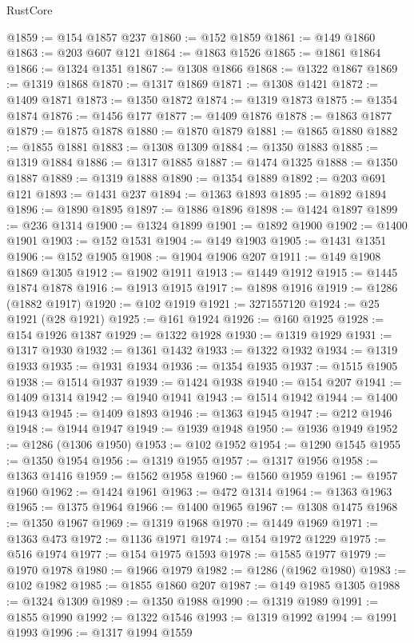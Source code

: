 \begin{lexlean}{RustCore}
\begin{coremodule}
@1859 := @154 @1857 @237
@1860 := @152 @1859
@1861 := @149 @1860
@1863 := @203 @607 @121
@1864 := @1863 @1526
@1865 := @1861 @1864
@1866 := @1324 @1351
@1867 := @1308 @1866
@1868 := @1322 @1867
@1869 := @1319 @1868
@1870 := @1317 @1869
@1871 := @1308 @1421
@1872 := @1409 @1871
@1873 := @1350 @1872
@1874 := @1319 @1873
@1875 := @1354 @1874
@1876 := @1456 @177
@1877 := @1409 @1876
@1878 := @1863 @1877
@1879 := @1875 @1878
@1880 := @1870 @1879
@1881 := @1865 @1880
@1882 := @1855 @1881
@1883 := @1308 @1309
@1884 := @1350 @1883
@1885 := @1319 @1884
@1886 := @1317 @1885
@1887 := @1474 @1325
@1888 := @1350 @1887
@1889 := @1319 @1888
@1890 := @1354 @1889
@1892 := @203 @691 @121
@1893 := @1431 @237
@1894 := @1363 @1893
@1895 := @1892 @1894
@1896 := @1890 @1895
@1897 := @1886 @1896
@1898 := @1424 @1897
@1899 := @236 @1314
@1900 := @1324 @1899
@1901 := @1892 @1900
@1902 := @1400 @1901
@1903 := @152 @1531
@1904 := @149 @1903
@1905 := @1431 @1351
@1906 := @152 @1905
@1908 := @1904 @1906 @207
@1911 := @149 @1908 @1869 @1305
@1912 := @1902 @1911
@1913 := @1449 @1912
@1915 := @1445 @1874 @1878
@1916 := @1913 @1915
@1917 := @1898 @1916
@1919 := @1286 (@1882 @1917)
@1920 := @102 @1919
@1921 := 3271557120
@1924 := @25 @1921 (@28 @1921)
@1925 := @161 @1924
@1926 := @160 @1925
@1928 := @154 @1926 @1387
@1929 := @1322 @1928
@1930 := @1319 @1929
@1931 := @1317 @1930
@1932 := @1361 @1432
@1933 := @1322 @1932
@1934 := @1319 @1933
@1935 := @1931 @1934
@1936 := @1354 @1935
@1937 := @1515 @1905
@1938 := @1514 @1937
@1939 := @1424 @1938
@1940 := @154 @207
@1941 := @1409 @1314
@1942 := @1940 @1941
@1943 := @1514 @1942
@1944 := @1400 @1943
@1945 := @1409 @1893
@1946 := @1363 @1945
@1947 := @212 @1946
@1948 := @1944 @1947
@1949 := @1939 @1948
@1950 := @1936 @1949
@1952 := @1286 (@1306 @1950)
@1953 := @102 @1952
@1954 := @1290 @1545
@1955 := @1350 @1954
@1956 := @1319 @1955
@1957 := @1317 @1956
@1958 := @1363 @1416
@1959 := @1562 @1958
@1960 := @1560 @1959
@1961 := @1957 @1960
@1962 := @1424 @1961
@1963 := @472 @1314
@1964 := @1363 @1963
@1965 := @1375 @1964
@1966 := @1400 @1965
@1967 := @1308 @1475
@1968 := @1350 @1967
@1969 := @1319 @1968
@1970 := @1449 @1969
@1971 := @1363 @473
@1972 := @1136 @1971
@1974 := @154 @1972 @1229
@1975 := @516 @1974
@1977 := @154 @1975 @1593
@1978 := @1585 @1977
@1979 := @1970 @1978
@1980 := @1966 @1979
@1982 := @1286 (@1962 @1980)
@1983 := @102 @1982
@1985 := @1855 @1860 @207
@1987 := @149 @1985 @1305
@1988 := @1324 @1309
@1989 := @1350 @1988
@1990 := @1319 @1989
@1991 := @1855 @1990
@1992 := @1322 @1546
@1993 := @1319 @1992
@1994 := @1991 @1993
@1996 := @1317 @1994 @1559

\end{coremodule}
\end{lexlean}
